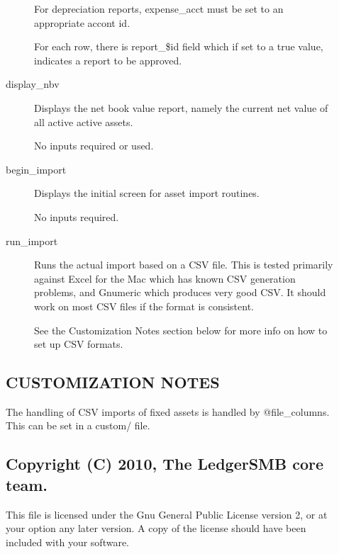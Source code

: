 \begin{description}
\begin{description}
For depreciation reports, expense\_acct must be set to an appropriate accont id.



For each row, there is  report\_\$id field which if set to a true value, indicates
a report to be approved.


\item[{display\_nbv}] \mbox{}

Displays the net book value report, namely the current net value of all active
active assets.



No inputs required or used.


\item[{begin\_import}] \mbox{}

Displays the initial screen for asset import routines.



No inputs required.


\item[{run\_import}] \mbox{}

Runs the actual import based on a CSV file.  This is tested primarily against
Excel for the Mac which has known CSV generation problems, and Gnumeric which 
produces very good CSV.  It should work on most CSV files if the format is 
consistent.



See the Customization Notes section below for more info on how to set up 
CSV formats.

\end{description}
\subsection*{CUSTOMIZATION NOTES\label{LedgerSMB::Scripts::asset_CUSTOMIZATION_NOTES}}


The handling of CSV imports of fixed assets is handled by @file\_columns.  This
can be set in a custom/ file.

\subsection*{Copyright (C) 2010, The LedgerSMB core team.\label{LedgerSMB::Scripts::asset_Copyright_C_2010_The_LedgerSMB_core_team_}}


This file is licensed under the Gnu General Public License version 2, or at your
option any later version.  A copy of the license should have been included with
your software.


\end{description}
